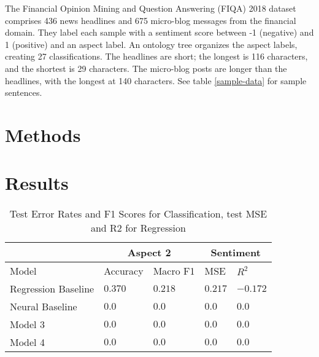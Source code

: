 \documentclass[11pt,a4paper,titlepage]{article}
\begin{document}
The Financial Opinion Mining and Question Answering (FIQA) 2018 dataset \citep{10.1145/3184558.3192301} comprises 436 news headlines and 675 micro-blog messages from the financial domain. They label each sample with a sentiment score between -1 (negative) and 1 (positive) and an aspect label. An ontology tree organizes the aspect labels, creating 27 classifications. The headlines are short; the longest is 116 characters, and the shortest is 29 characters. The micro-blog posts are longer than the headlines, with the longest at 140 characters. See table \ref{sample-data} for sample sentences.

\section{Methods}



\section{Results}

\begin{table*}
  \small
  \caption{Test Error Rates and F1 Scores for Classification, test MSE and R2 for Regression}
  \label{results-table}
  \centering
  \begin{tabular}{lllll}
    \multicolumn{1}{c}{} & \multicolumn{2}{c}{Aspect 2} & \multicolumn{2}{c}{Sentiment}\\
    \hline
    Model                   & Accuracy         & Macro F1         & MSE              & $R^2$ \\ 
    \midrule
    Regression Baseline     & $\mathbf{0.370}$ & $\mathbf{0.218}$ & $\mathbf{0.217}$ & $\mathbf{-0.172}$ \\
    Neural Baseline         & $0.0$            & $0.0$            & $0.0$            & $0.0$             \\
    Model 3                 & $0.0$            & $0.0$            & $0.0$            & $0.0$             \\
    Model 4                 & $0.0$            & $0.0$            & $0.0$            & $0.0$             \\
    \bottomrule
  \end{tabular}
\end{table*}


\end{document}
